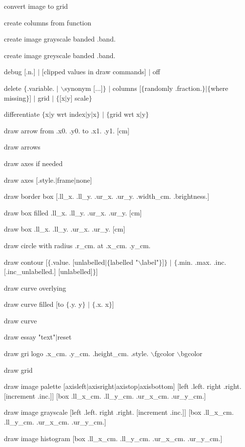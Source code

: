 convert image to grid

create columns from function

create image grayscale banded .band.

create image greyscale banded .band.

debug [.n.] $\mid$ [clipped values in draw commands] $\mid$ off

delete $\lbrace$.variable. $\mid$ $\backslash$synonym [...]$\rbrace$ $\mid$ columns [$\lbrace$randomly .fraction.$\rbrace$$\mid$$\lbrace$where missing$\rbrace$] $\mid$ grid $\mid$ $\lbrace$[x$\mid$y] scale$\rbrace$

differentiate $\lbrace$x$\mid$y wrt index$\mid$y$\mid$x$\rbrace$ $\mid$ $\lbrace$grid wrt x$\mid$y$\rbrace$

draw arrow from .x0. .y0. to .x1. .y1. [cm]

draw arrows

draw axes if needed

draw axes [.style.$\mid$frame$\mid$none]

draw border box [.ll\_x. .ll\_y. .ur\_x. .ur\_y. .width\_cm. .brightness.]

draw box filled .ll\_x. .ll\_y. .ur\_x. .ur\_y. [cm]

draw box .ll\_x. .ll\_y. .ur\_x. .ur\_y. [cm]

draw circle with radius .r\_cm. at .x\_cm. .y\_cm.

draw contour [$\lbrace$.value. [unlabelled$\mid$$\lbrace$labelled "$\backslash$label"$\rbrace$]$\rbrace$ $\mid$ $\lbrace$.min. .max. .inc. [.inc\_unlabelled.] [unlabelled]$\rbrace$]

draw curve overlying

draw curve filled [to $\lbrace$.y. y$\rbrace$ $\mid$ $\lbrace$.x. x$\rbrace$]

draw curve

draw essay "text"$\mid$reset

draw gri logo .x\_cm. .y\_cm. .height\_cm. .style. $\backslash$fgcolor $\backslash$bgcolor

draw grid

draw image palette [axisleft$\mid$axisright$\mid$axistop$\mid$axisbottom] [left .left. right .right. [increment .inc.]] [box .ll\_x\_cm. .ll\_y\_cm. .ur\_x\_cm. .ur\_y\_cm.]

draw image grayscale [left .left. right .right. [increment .inc.]] [box .ll\_x\_cm. .ll\_y\_cm. .ur\_x\_cm. .ur\_y\_cm.]

draw image histogram [box .ll\_x\_cm. .ll\_y\_cm. .ur\_x\_cm. .ur\_y\_cm.]

